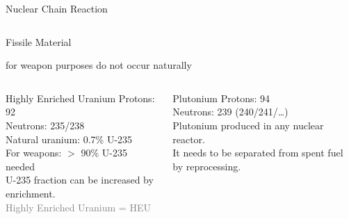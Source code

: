 \documentclass[presentation]{beamer}
\begin{document}
\begin{frame}[label=sec-1-3]{Nuclear Chain Reaction}
\begin{columns}
\begin{column}{0.45\textwidth}
\end{column}
\end{columns}
\end{frame}

\begin{frame}[label=sec-1-4]{Fissile Material}
\begin{center}
for weapon purposes do not occur naturally
\end{center}

\begin{columns}[t]
\begin{column}{0.5\textwidth}
\begin{block}{Highly Enriched Uranium}
\small
Protons: 92\\
    Neutrons: 235/238\\[1em]

Natural uranium: 0.7\% U-235\\
    For weapons: $>$ 90\% U-235 needed\\[0.5em]

U-235 fraction can be increased by \alert{enrichment}.\\[0.8em]

\textcolor{gray}{Highly Enriched Uranium =  HEU}
\end{block}
\end{column}


\begin{column}{0.45\textwidth}
\begin{block}{Plutonium}
\small Protons: 94\\
    Neutrons: 239 (240/241/\ldots{})\\[1em]


Plutonium produced in any nuclear reactor.\\[0.5em]

It needs to be separated from spent fuel by \alert{reprocessing}.
\end{block}
\end{column}
\end{columns}
\end{frame}
\end{document}

